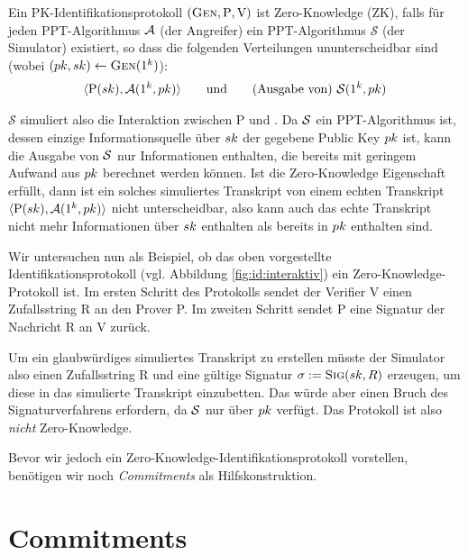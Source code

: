 \begin{definition}
\label{def:zk}
Ein PK-Identifikationsprotokoll $(\textsc{Gen}, \mathrm{P}, \mathrm{V})$ ist Zero-Knowledge (ZK), falls für jeden PPT-Algorithmus $\mathcal{A}$ (der
Angreifer) ein PPT-Algorithmus $\mathcal{S}$ (der Simulator) existiert, so dass die folgenden Verteilungen ununterscheidbar sind (wobei
$(pk, sk) \leftarrow \textsc{Gen}(1^k)$):
\begin{align*}
\langle \mathrm{P}(sk), \mathcal{A}(1^k, pk) \rangle \text{\qquad und\qquad (Ausgabe von) } \mathcal{S}(1^k, pk)
\end{align*}
\end{definition}

$\mathcal{S}$ simuliert also die Interaktion zwischen P und \A. Da $\mathcal{S}$ ein PPT-Algorithmus ist, dessen einzige Informationsquelle über $sk$ der gegebene Public Key $pk$ ist, kann die Ausgabe von $\mathcal{S}$ nur Informationen enthalten, die bereits mit geringem Aufwand aus $pk$ berechnet werden können. Ist die Zero-Knowledge Eigenschaft erfüllt, dann ist ein solches simuliertes Transkript von einem echten Transkript $\langle \mathrm{P}(sk), \mathcal{A}(1^k, pk) \rangle$ nicht unterscheidbar, also kann auch das echte Transkript nicht mehr Informationen über $sk$ enthalten als bereits in $pk$ enthalten sind.

Wir untersuchen nun als Beispiel, ob das oben vorgestellte Identifikationsprotokoll (vgl. Abbildung \ref{fig:id:interaktiv}) ein Zero-Knowledge-Protokoll ist. Im ersten Schritt des Protokolls sendet der Verifier V einen Zufallsstring R an den Prover P. Im zweiten Schritt sendet P eine Signatur der Nachricht R an V zurück.

Um ein glaubwürdiges simuliertes Transkript zu erstellen müsste der Simulator also einen Zufallsstring R und eine gültige Signatur $\sigma := \textsc{Sig}(sk, R)$ erzeugen, um diese in das simulierte Transkript einzubetten. Das würde aber einen Bruch des Signaturverfahrens erfordern, da $\mathcal{S}$ nur über $pk$ verfügt. Das Protokoll ist also \emph{nicht} Zero-Knowledge.

Bevor wir jedoch ein Zero-Knowledge-Identifikationsprotokoll vorstellen, benötigen wir noch \emph{Commitments} als Hilfskonstruktion.


\section{Commitments}

